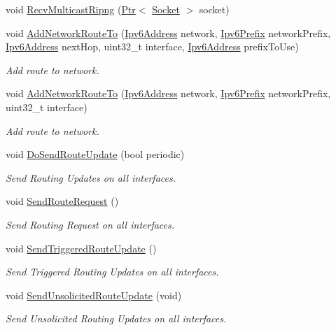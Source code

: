 \begin{DoxyCompactItemize}
void \hyperlink{classns3_1_1RipNg_aa0d0eaae30d312fe172fa9a7fc8d6d48}{Recv\+Multicast\+Ripng} (\hyperlink{classns3_1_1Ptr}{Ptr}$<$ \hyperlink{classns3_1_1Socket}{Socket} $>$ socket)
\item 
void \hyperlink{classns3_1_1RipNg_a9d8c7bb0b6622946c347a88dabc06802}{Add\+Network\+Route\+To} (\hyperlink{classns3_1_1Ipv6Address}{Ipv6\+Address} network, \hyperlink{classns3_1_1Ipv6Prefix}{Ipv6\+Prefix} network\+Prefix, \hyperlink{classns3_1_1Ipv6Address}{Ipv6\+Address} next\+Hop, uint32\+\_\+t interface, \hyperlink{classns3_1_1Ipv6Address}{Ipv6\+Address} prefix\+To\+Use)
\begin{DoxyCompactList}\small\item\em Add route to network. \end{DoxyCompactList}\item 
void \hyperlink{classns3_1_1RipNg_ad70799f2ec1d8ecb8829e6059114967d}{Add\+Network\+Route\+To} (\hyperlink{classns3_1_1Ipv6Address}{Ipv6\+Address} network, \hyperlink{classns3_1_1Ipv6Prefix}{Ipv6\+Prefix} network\+Prefix, uint32\+\_\+t interface)
\begin{DoxyCompactList}\small\item\em Add route to network. \end{DoxyCompactList}\item 
void \hyperlink{classns3_1_1RipNg_a110005349bf811e1b0f6af182298be15}{Do\+Send\+Route\+Update} (bool periodic)
\begin{DoxyCompactList}\small\item\em Send Routing Updates on all interfaces. \end{DoxyCompactList}\item 
void \hyperlink{classns3_1_1RipNg_aa97c9ec93505c548bbf85ef18c532147}{Send\+Route\+Request} ()
\begin{DoxyCompactList}\small\item\em Send Routing Request on all interfaces. \end{DoxyCompactList}\item 
void \hyperlink{classns3_1_1RipNg_ad7a8e445116b3dd8cdd1d50366787c66}{Send\+Triggered\+Route\+Update} ()
\begin{DoxyCompactList}\small\item\em Send Triggered Routing Updates on all interfaces. \end{DoxyCompactList}\item 
void \hyperlink{classns3_1_1RipNg_af4dc944e60808380f6c5af16bf867fdc}{Send\+Unsolicited\+Route\+Update} (void)
\begin{DoxyCompactList}\small\item\em Send Unsolicited Routing Updates on all interfaces. \end{DoxyCompactList}\item 

\end{DoxyCompactItemize}
